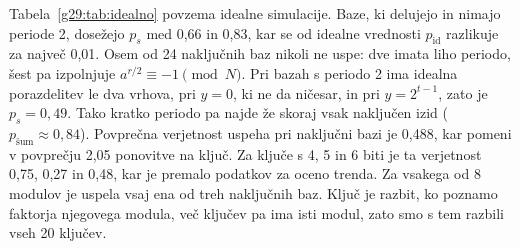  Tabela~\ref{g29:tab:idealno} povzema idealne simulacije. Baze, ki delujejo in nimajo periode 2, dosežejo $p_s$ med 0,66 in 0,83, kar se od idealne vrednosti $p_\text{id}$ razlikuje za največ 0,01. Osem od 24 naključnih baz nikoli ne uspe: dve imata liho periodo, šest pa izpolnjuje $a^{r/2} \equiv -1 \pmod N$. Pri bazah s periodo 2 ima idealna porazdelitev le dva vrhova, pri $y = 0$, ki ne da ničesar, in pri $y = 2^{t-1}$, zato je $p_s = 0{,}49$. Tako kratko periodo pa najde že skoraj vsak naključen izid ($p_\text{šum} \approx 0{,}84$). Povprečna verjetnost uspeha pri naključni bazi je 0,488, kar pomeni v povprečju 2,05 ponovitve na ključ. Za ključe s 4, 5 in 6 biti je ta verjetnost 0,75, 0,27 in 0,48, kar je premalo podatkov za oceno trenda. Za vsakega od 8 modulov je uspela vsaj ena od treh naključnih baz. Ključ je razbit, ko poznamo faktorja njegovega modula, več ključev pa ima isti modul, zato smo s tem razbili vseh 20 ključev.

